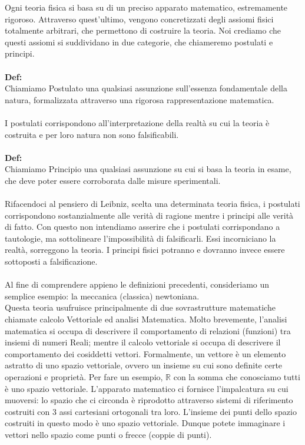 \documentclass[]{article}
\begin{document}
	Ogni teoria fisica si basa su di un preciso apparato matematico, estremamente rigoroso. Attraverso quest'ultimo, vengono concretizzati degli assiomi fisici totalmente arbitrari, che permettono di costruire la teoria. Noi crediamo che questi assiomi si suddividano in due categorie, che chiameremo postulati e principi.\\
	\\
	\textbf{Def:}\\
	Chiamiamo Postulato una qualsiasi assunzione sull'essenza fondamentale della natura, formalizzata attraverso una rigorosa rappresentazione matematica.
	\\
	\\
	I postulati corrispondono all'interpretazione della realtà su cui la teoria è costruita e per loro natura non sono falsificabili.
	\\\\
	\textbf{Def:}\\
	Chiamiamo Principio una qualsiasi assunzione su cui si basa la teoria in esame, che deve poter essere corroborata dalle misure sperimentali.
	\\
	\\
	Rifacendoci al pensiero di Leibniz, scelta una determinata teoria fisica, i postulati corrispondono sostanzialmente alle verità di ragione mentre i principi alle verità di fatto. Con questo non intendiamo asserire che i postulati corrispondano a tautologie, ma sottolineare l'impossibilità di falsificarli. Essi incorniciano la realtà, sorreggono la teoria. I principi fisici potranno e dovranno invece essere sottoposti a falsificazione.\\
	\\
	Al fine di comprendere appieno le definizioni precedenti, consideriamo un semplice esempio: la meccanica (classica) newtoniana.\\
	Questa teoria usufruisce principalmente di due sovrastrutture matematiche chiamate calcolo Vettoriale ed analisi Matematica. Molto brevemente, l'analisi matematica si occupa di descrivere il comportamento di relazioni (funzioni) tra insiemi di numeri Reali; mentre il calcolo vettoriale si occupa di descrivere il comportamento dei cosiddetti vettori. Formalmente, un vettore è un elemento astratto di uno spazio vettoriale, ovvero un insieme su cui sono definite certe operazioni e proprietà. Per fare un esempio, $\mathbb{R}$ con la somma che conosciamo tutti è uno spazio vettoriale. L'apparato matematico ci fornisce l'impalcatura su cui muoversi: lo spazio che ci circonda è riprodotto attraverso sistemi di riferimento costruiti con 3 assi cartesiani ortogonali tra loro. L'insieme dei punti dello spazio costruiti in questo modo è uno spazio vettoriale. Dunque potete immaginare i vettori nello spazio come punti o frecce (coppie di punti). \\
\end{document}
